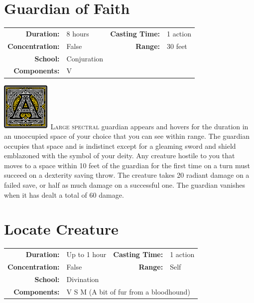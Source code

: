 \documentclass[12pt,showtrims]{memoir}
\begin{document}
\section*{Guardian of Faith}

{
\small\centering\vspace{-6pt}
\begin{tabular}{rlrl}
\toprule

\textbf{Duration:} & 8 hours &
\textbf{Casting Time:} & 1 action \\
\textbf{Concentration:} & False &
\textbf{Range:} & 30 feet \\
\textbf{School:} & Conjuration \\
\textbf{Components:} & \multicolumn{3}{p{0.7\textwidth}}{V}\\

\bottomrule
\end{tabular}
}

\vspace{1\baselineskip}\noindent 
\vspace{1\baselineskip}\noindent
\lettrine[lines=4]{\includegraphics[height=66pt]{initials/A.png}}{\ Large spectral} guardian appears and hovers for the duration in an unoccupied space of your choice that you can see within range. The guardian occupies that space and is indistinct except for a gleaming sword and shield emblazoned with the symbol of your deity. Any creature hostile to you that moves to a space within 10 feet of the guardian for the first time on a turn must succeed on a dexterity saving throw. The creature takes 20 radiant damage on a failed save, or half as much damage on a successful one. The guardian vanishes when it has dealt a total of 60 damage.

\newpage
\section*{Locate Creature}
{
\small\centering\vspace{-6pt}
\begin{tabular}{rlrl}
\toprule

\textbf{Duration:} & Up to 1 hour &
\textbf{Casting Time:} & 1 action \\
\textbf{Concentration:} & False &
\textbf{Range:} & Self \\
\textbf{School:} & Divination \\
\textbf{Components:} & \multicolumn{3}{p{0.7\textwidth}}{V S M (A bit of fur from a bloodhound)}\\

\bottomrule
\end{tabular}
}
\end{document}

